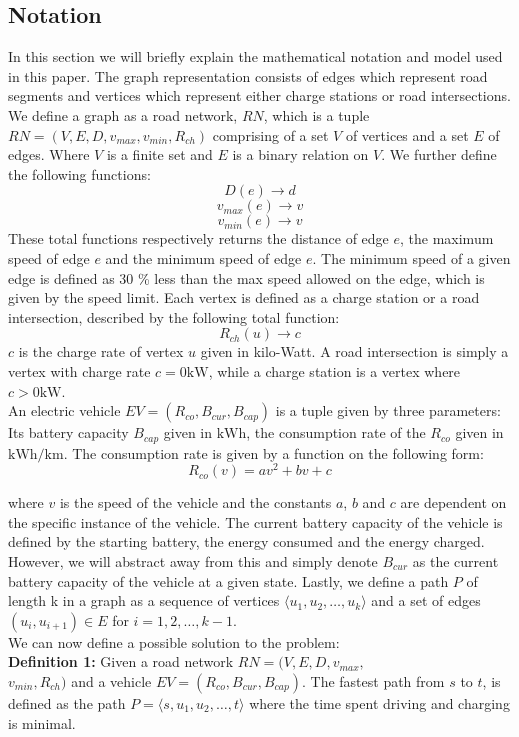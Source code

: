 \subsection{Notation} \label{sec:notation}
In this section we will briefly explain the mathematical notation and model used in this paper. The graph representation consists of edges which represent road segments and vertices which represent either charge stations or road intersections. We define a graph as a road network, $RN$, which is a tuple $RN=(V,E,D,v_{max},v_{min},R_{ch})$ comprising of a set $V$ of vertices and a set $E$ of edges. Where $V$ is a finite set and $E$ is a binary relation on $V$. We further define the following functions:
\[ D(e)\rightarrow d \] 
\[ v_{max}(e)\rightarrow v \]
\[ v_{min}(e)\rightarrow v \]
These total functions respectively returns the distance of edge $e$, the maximum speed of edge $e$ and the minimum speed of edge $e$. The minimum speed of a given edge is defined as 30 \% less than the max speed allowed on the edge, which is given by the speed limit. Each vertex is defined as a charge station or a road intersection, described by the following total function:
\[R_{ch}(u)\rightarrow c\]
$c$ is the charge rate of vertex $u$ given in kilo-Watt. A road intersection is simply a vertex with charge rate $c = 0\si{\kW}$, while a charge station is a vertex where $c > 0\si{\kW}$.\\ 

An electric vehicle $EV=(R_{co},B_{cur},B_{cap})$ is a tuple given by three parameters: Its battery capacity $B_{cap}$ given in $\si{\kWh}$, the consumption rate of the $R_{co}$ given in $\si{\kWh\per\km}$. The consumption rate is given by a function on the following form:
\[ R_{co}(v)=av^2+bv+c \]

where $v$ is the speed of the vehicle and the constants $a$, $b$ and $c$ are dependent on the specific instance of the vehicle. The current battery capacity of the vehicle is defined by the starting battery, the energy consumed and the energy charged. However, we will abstract away from this and simply denote $B_{cur}$ as the current battery capacity of the vehicle at a given state. Lastly, we define a path $P$ of length k in a graph as a sequence of vertices $\langle u_1,u_2,\dots,u_k \rangle$ and a set of edges $(u_{i},u_{i+1})\in E$ for $i=1,2,\dots,k-1$.\\

We can now define a possible solution to the problem:\\

\textbf{Definition 1:} Given a road network $RN=(V,E,D,v_{max},$\\ 
$v_{min},R_{ch})$ and a vehicle $EV=(R_{co},B_{cur},B_{cap})$. The fastest path 
from $s$ to $t$, is defined as the path $P = \langle s,u_1,u_2,\dots,t \rangle$ where the time spent driving and charging is minimal.



